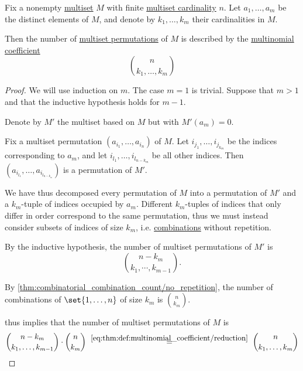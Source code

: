 \begin{proposition}\label{thm:multiset_permutation_count}
  Fix a nonempty \hyperref[def:multiset]{multiset} \( M \) with finite \hyperref[def:multiset/cardinality]{multiset cardinality} \( n \). Let \( a_1, \ldots, a_m \) be the distinct elements of \( M \), and denote by \( k_1, \ldots, k_m \) their cardinalities in \( M \).

  Then the number of \hyperref[def:multiset_permutation]{multiset permutations} of \( M \) is described by the \hyperref[def:multinomial_coefficient]{multinomial coefficient}
  \begin{equation}\label{eq:thm:multiset_permutation_count}
    \binom n {k_1, \ldots, k_m}
  \end{equation}
\end{proposition}
\begin{proof}
  We will use induction on \( m \). The case \( m = 1 \) is trivial. Suppose that \( m > 1 \) and that the inductive hypothesis holds for \( m - 1 \).

  Denote by \( M' \) the multiset based on \( M \) but with \( M'(a_m) = 0 \).

  Fix a multiset permutation \( (a_{i_1}, \ldots, a_{i_n}) \) of \( M \). Let \( i_{j_1}, \ldots, i_{j_{k_m}} \) be the indices corresponding to \( a_m \), and let \( i_{l_1}, \ldots, i_{l_{n - k_m}} \) be all other indices. Then \( (a_{i_{l_1}}, \ldots, a_{i_{l_{n - k_m}}}) \) is a permutation of \( M' \).

  We have thus decomposed every permutation of \( M \) into a permutation of \( M' \) and a \( k_m \)-tuple of indices occupied by \( a_m \). Different \( k_m \)-tuples of indices that only differ in order correspond to the same permutation, thus we must instead consider subsets of indices of size \( k_m \), i.e. \hyperref[def:combinatorial_combination]{combinations} without repetition.

  By the inductive hypothesis, the number of multiset permutations of \( M' \) is
  \begin{equation*}
    \binom {n - k_m} {k_1, \cdots, k_{m-1}}.
  \end{equation*}

  By \cref{thm:combinatorial_combination_count/no_repetition}, the number of combinations of \( \set{ 1, \ldots, n } \) of size \( k_m \) is \( \binom n {k_m} \).

   thus implies that the number of multiset permutations of \( M \) is
  \begin{equation*}
    \binom {n - k_m} {k_1, \ldots, k_{m-1}}
    \cdot
    \binom n {k_m}
    \reloset {\eqref{eq:thm:def:multinomial_coefficient/reduction}} =
    \binom n {k_1, \ldots, k_m}
  \end{equation*}
\end{proof}
